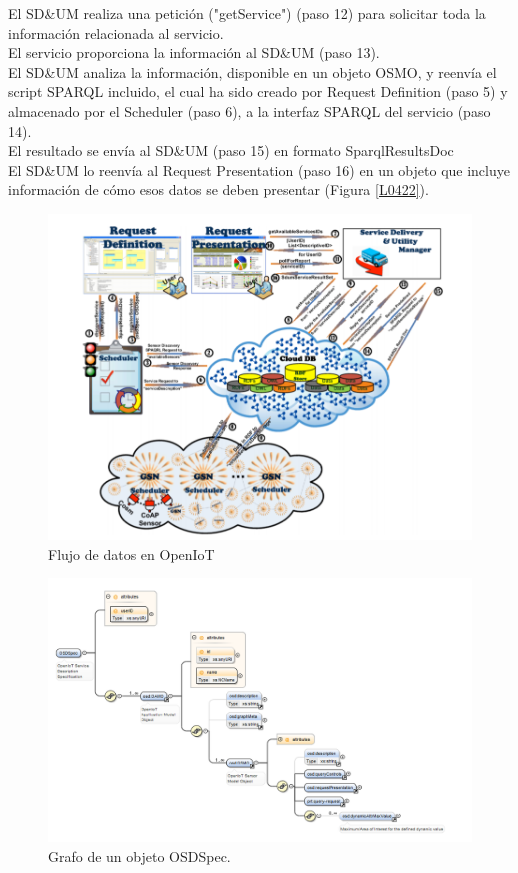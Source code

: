\documentclass[12pt, twoside]{book}
\begin{document}
El SD\&UM realiza una petición ("getService") (paso 12) para solicitar toda la información relacionada al servicio.\\
El servicio proporciona la información al SD\&UM (paso 13).\\
El SD\&UM analiza la información, disponible en un objeto OSMO, y reenvía el script SPARQL incluido, el cual ha sido creado por Request Definition (paso 5) y almacenado por el Scheduler (paso 6), a la interfaz SPARQL del servicio (paso 14).\\
El resultado se envía al SD\&UM (paso 15) en formato SparqlResultsDoc\\El SD\&UM lo reenvía al Request Presentation (paso 16) en un objeto que incluye información de cómo esos datos se deben presentar (Figura \ref{L0422}).

\begin{figure}[H]
\centering
\includegraphics[scale=0.5]{images/dataFlow_capture}
\caption{Flujo de datos en OpenIoT}\label{L0420}
\end{figure}

\begin{figure}[H]
\centering
\includegraphics[scale=0.5]{images/osd_sdum}
\caption{Grafo de un objeto OSDSpec.}\label{L0421}
\end{figure}
\end{document}

